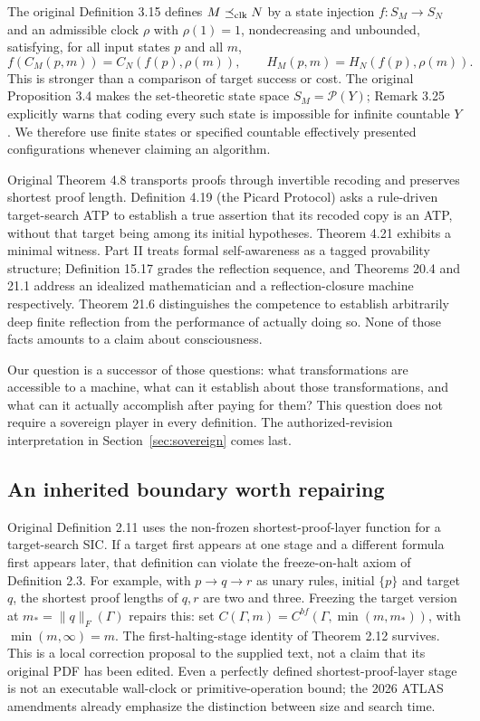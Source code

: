 \documentclass[11pt]{article}
\theoremstyle{remark}\newtheorem{remark}[theorem]{Remark}
\begin{document}
The original Definition 3.15 defines $M\preceq_{\rm clk}N$ by a state injection $f:S_M\to S_N$ and an admissible clock $\rho$ with $\rho(1)=1$, nondecreasing and unbounded, satisfying, for all input states $p$ and all $m$,
\[
 f(C_M(p,m))=C_N(f(p),\rho(m)),\qquad H_M(p,m)=H_N(f(p),\rho(m)).
\]
This is stronger than a comparison of target success or cost. The original Proposition 3.4 makes the set-theoretic state space $S_M=\mathcal P(Y)$; Remark 3.25 explicitly warns that coding every such state is impossible for infinite countable $Y$. We therefore use finite states or specified countable effectively presented configurations whenever claiming an algorithm.

Original Theorem 4.8 transports proofs through invertible recoding and preserves shortest proof length. Definition 4.19 (the Picard Protocol) asks a rule-driven target-search ATP to establish a true assertion that its recoded copy is an ATP, without that target being among its initial hypotheses. Theorem 4.21 exhibits a minimal witness. Part II treats formal self-awareness as a tagged provability structure; Definition 15.17 grades the reflection sequence, and Theorems 20.4 and 21.1 address an idealized mathematician and a reflection-closure machine respectively. Theorem 21.6 distinguishes the competence to establish arbitrarily deep finite reflection from the performance of actually doing so. None of those facts amounts to a claim about consciousness.

Our question is a successor of those questions: what transformations are accessible to a machine, what can it establish about those transformations, and what can it actually accomplish after paying for them? This question does not require a sovereign player in every definition. The authorized-revision interpretation in Section~\ref{sec:sovereign} comes last.

\subsection{An inherited boundary worth repairing}
Original Definition 2.11 uses the non-frozen shortest-proof-layer function for a target-search SIC. If a target first appears at one stage and a different formula first appears later, that definition can violate the freeze-on-halt axiom of Definition 2.3. For example, with $p\to q\to r$ as unary rules, initial $\{p\}$ and target $q$, the shortest proof lengths of $q,r$ are two and three. Freezing the target version at $m_* = \|q\|_F(\Gamma)$ repairs this: set $C(\Gamma,m)=C^{bf}(\Gamma,\min(m,m_*))$, with $\min(m,\infty)=m$. The first-halting-stage identity of Theorem 2.12 survives. This is a local correction proposal to the supplied text, not a claim that its original PDF has been edited. Even a perfectly defined shortest-proof-layer stage is not an executable wall-clock or primitive-operation bound; the 2026 ATLAS amendments already emphasize the distinction between size and search time.
\end{document}
